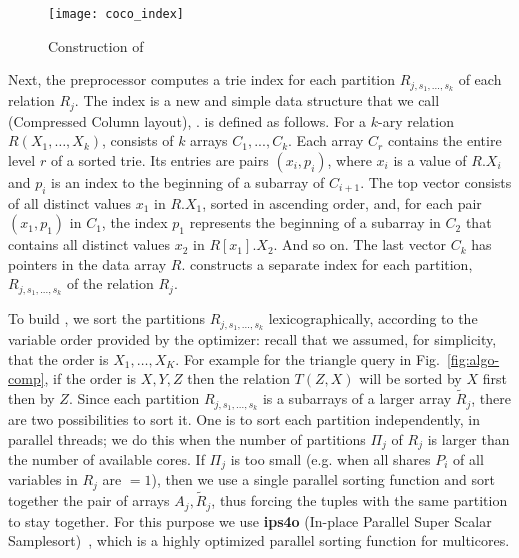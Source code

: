 \begin{figure}[t]
  \centering
  \texttt{[image: coco\_index]}
  \caption{Construction of \indexlayout}
  \label{fig:cocoindex}
\end{figure}

Next, the preprocessor computes a trie index for each partition
$R_{j,s_1, \ldots, s_k}$ of each relation $R_j$. The index is a new
and simple data structure that we call \indexlayout (Compressed Column
layout), . \indexlayout is
defined as follows. For a $k$-ary relation $R(X_1, \ldots, X_k)$,
\indexlayout consists of $k$ arrays $C_1, ..., C_{k}$.  Each array
$C_r$ contains the entire level $r$ of a sorted trie.  Its entries are
pairs $(x_i,p_i)$, where $x_i$ is a value of $R.X_i$ and $p_i$ is an
index to the beginning of a subarray of $C_{i+1}$.  The top vector
consists of all distinct values $x_1$ in $R.X_1$, sorted in ascending
order, and, for each pair $(x_1, p_1)$ in $C_1$, the index $p_1$
represents the beginning of a subarray in $C_2$ that contains all
distinct values $x_2$ in $R[x_1].X_2$.  And so on. The last vector
$C_{k}$ has pointers in the data array $R$. \name constructs a
separate \indexlayout index for each partition, $R_{j,s_1,...,s_k}$ of
the relation $R_j$.

To build \indexlayout, we sort the partitions $R_{j,s_1,\ldots,s_k}$
lexicographically, according to the variable order provided by the
optimizer: recall that we assumed, for simplicity, that the order is
$X_1, \ldots, X_K$. For example for the triangle query in
Fig.~\ref{fig:algo-comp}, if the order is $X,Y,Z$ then the relation
$T(Z,X)$ will be sorted by $X$ first then by $Z$.  Since each
partition $R_{j,s_1,\ldots,s_k}$ is a subarrays of a larger array
$\tilde R_j$, there are two possibilities to sort it.  One is to sort
each partition independently, in parallel threads; we do this when the
number of partitions $\Pi_j$ of $R_j$ is larger than the number of
available cores. If $\Pi_j$ is too small (e.g. when all shares $P_i$
of all variables in $R_j$ are $=1$), then we use a single parallel
sorting function and sort together the pair of arrays
$A_j,\tilde R_j$, thus forcing the tuples with the same partition to
stay together.  For this purpose we use \textbf{ips4o} (In-place
Parallel Super Scalar Samplesort)~\cite{axtmann2017,
  axtmann2020engineering}, which is a highly optimized parallel
sorting function for multicores.

